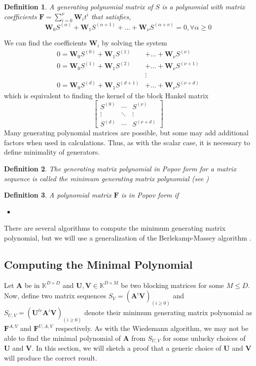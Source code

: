 \documentclass[12pt]{article}
\newtheorem{definition}{Definition}
\def\mA{\mathbf{A}}
\def\mF{\mathbf{F}}
\def\mU{\mathbf{U}}
\def\mV{\mathbf{V}}
\def\mW{\mathbf{W}}
\begin{document}
\begin{definition}
	A generating polynomial matrix of $S$ is 
	a polynomial with matrix coefficients
	$\mF = \sum^{\nu}_{i=0} \mW_i t^i $ that satisfies,
	$$ \mW_0 S^{(\alpha)} + \mW_1 S^{(\alpha+1)} + \dots + \mW_\nu S^{(\alpha+\nu)}  = 0, \forall \alpha \ge 0$$ 
\end{definition}
We can find the coefficients $\mW_i$ by solving the system
\begin{align*}
	0 = \mW_0 S^{(0)} + \mW_1 S^{(1)} &+ \dots + \mW_\nu S^{(\nu)}   \\
	0 = \mW_0 S^{(1)} + \mW_1 S^{(2)} &+ \dots + \mW_\nu S^{(\nu+1)} \\
	&\vdots \\
	0 = \mW_0 S^{(d)} + \mW_1 S^{(d+1)} &+ \dots + \mW_\nu S^{(\nu+d)}
\end{align*}
which is equivalent to finding the kernel of the block Hankel
matrix
$$ \begin{bmatrix}
S^{(0)} & \cdots & S^{(\nu)}\\
\vdots & \ddots & \vdots\\
S^{(d)} & \cdots & S^{(\nu + d)}
\end{bmatrix}$$
Many generating polynomial matrices are possible, but some
may add additional factors when used in calculations.
Thus, as with the scalar case, it is necessary to define
minimality of generators.

\begin{definition}
	The generating matrix polynomial in Popov form
	for a matrix sequence is called
	the minimum generating matrix polynomial (see
	\cite[definition 2.3]{KaVi04})
\end{definition}

\begin{definition}
	A polynomial matrix $\mF$ is in Popov form if
	\begin{itemize}
		\item 
	\end{itemize}
\end{definition}

There are several algorithms to compute the minimum generating
matrix polynomial, but we will use a generalization
of the Berlekamp-Massey algorithm \cite{Coppersmith93}.


\subsection{Computing the Minimal Polynomial}
Let $\mA$ be in $\mathbb{K}^{D \times D}$ and 
$\mU,\mV \in \mathbb{K}^{D \times M}$ be two blocking matrices
for some $M \le D$. Now, define two matrix sequences
$S_V = (\mA^i \mV)_{(i \ge 0)}$ and 
$S_{U,V} = (\mU^{tr} \mA^i \mV)_{(i \ge 0)}$ denote their minimum
generating matrix polynomial as $\mF^{A,V}$ and $\mF^{U,A,V}$
respectively. As with the Wiedemann algorithm, we may not
be able to find the minimal polynomial of $\mA$ from 
$S_{U,V}$ for some unlucky choices of $\mU$ and $\mV$. In this
section, we will sketch a proof that a generic choice of
$\mU$ and $\mV$ will produce the correct result.
\end{document}
